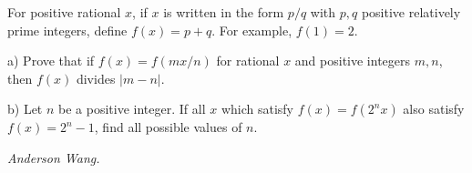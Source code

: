 For positive rational $x$, if $x$ is written in the form $p/q$ with $p, q$ positive relatively prime integers, define $f(x)=p+q$. For example, $f(1)=2$.

a) Prove that if $f(x)=f(mx/n)$ for rational $x$ and positive integers $m, n$, then $f(x)$ divides $|m-n|$.

b) Let $n$ be a positive integer. If all $x$ which satisfy $f(x)=f(2^nx)$ also satisfy $f(x)=2^n-1$, find all possible values of $n$.

\textit{Anderson Wang.}